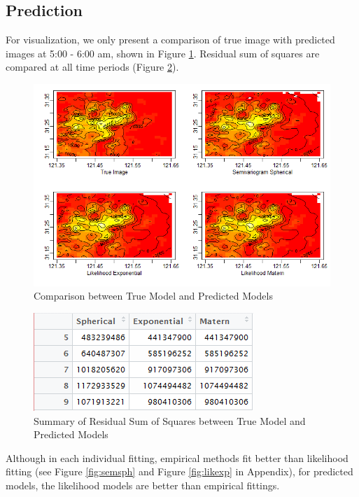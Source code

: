 \documentclass[hidelinks,12pt]{article}
\begin{document}
	\subsection{Prediction}
	For visualization, we only present a comparison of true image with predicted images at 5:00 - 6:00 am, shown in Figure \ref{fig:pred5}. Residual sum of squares are compared at all time periods (Figure \ref{fig:predsum}).
	\begin{figure}[!ht]
		\includegraphics[width=\textwidth]{prediction_at_5.png}
		\caption{Comparison between True Model and Predicted Models \label{fig:pred5}}
	\end{figure}
\FloatBarrier
	\begin{figure}[!ht]
		\centering
		\includegraphics{pred_result_total.png}
		\caption{Summary of Residual Sum of Squares between True Model and Predicted Models \label{fig:predsum}}
	\end{figure}
\FloatBarrier

	 Although in each individual fitting, empirical methods fit better than likelihood fitting (see Figure \ref{fig:semsph} and Figure \ref{fig:likexp} in Appendix), for predicted models, the likelihood models are better than empirical fittings.
	 
\end{document}
